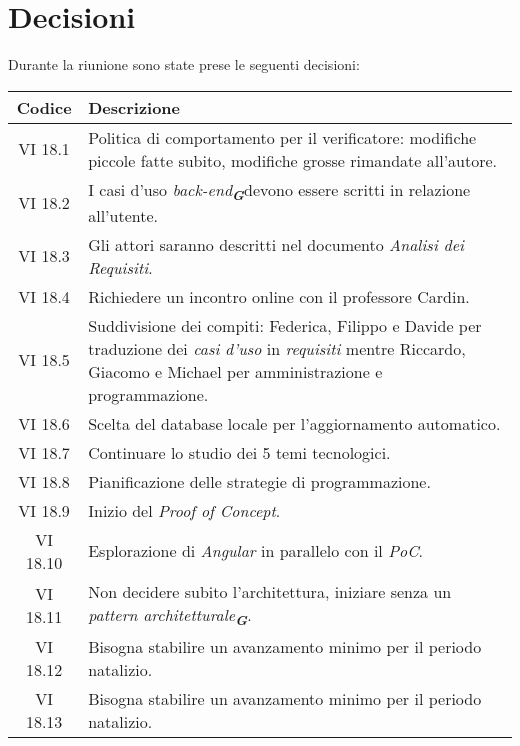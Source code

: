 
\section{Decisioni}

Durante la riunione sono state prese le seguenti decisioni:

\vspace{0.5cm}

\begin{table}[htbp]
    \centering
    \begin{tabular}{|c|p{}|}
        \hline
        \rowcolor[gray]{0.75}
        \textbf{Codice} & \textbf{Descrizione}\\
        \hline
        VI 18.1 & Politica di comportamento per il verificatore: modifiche piccole fatte subito, modifiche grosse rimandate all'autore.\\
        \hline
        VI 18.2 & I casi d'uso \emph{back-end}\textsubscript{\textit{\textbf{G}}}devono essere scritti in relazione all'utente.\\
        \hline
        VI 18.3 & Gli attori saranno descritti nel documento \emph{Analisi dei Requisiti}.\\
        \hline
        VI 18.4 & Richiedere un incontro online con il professore Cardin. \\
        \hline
        VI 18.5 & Suddivisione dei compiti: Federica, Filippo e Davide per traduzione dei \emph{casi d'uso} in \emph{requisiti} mentre Riccardo, Giacomo e Michael per amministrazione e programmazione.\\
        \hline
        VI 18.6 & Scelta del database locale per l'aggiornamento automatico. \\
        \hline
        VI 18.7 & Continuare lo studio dei 5 temi tecnologici.\\
        \hline
        VI 18.8 & Pianificazione delle strategie di programmazione.\\
        \hline
        VI 18.9 & Inizio del \emph{Proof of Concept}.\\
        \hline
        VI 18.10 & Esplorazione di \emph{Angular} in parallelo con il \emph{PoC}.\\
        \hline
        VI 18.11 & Non decidere subito l'architettura, iniziare senza un \emph{pattern architetturale}\textsubscript{\textit{\textbf{G}}}.\\
        \hline
        VI 18.12 & Bisogna stabilire un avanzamento minimo per il periodo natalizio.\\
        \hline
        VI 18.13 & Bisogna stabilire un avanzamento minimo per il periodo natalizio.\\
        \hline
    \end{tabular}
\end{table}